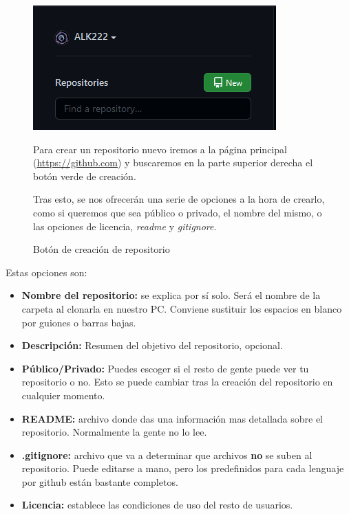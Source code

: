 \begin{figure}[ht]
    \begin{minipage}{0.3\linewidth}
        \centering
        \includegraphics[width=0.9\linewidth,]{creacion_repo.png}
        \caption{Botón de creación de repositorio}
        \label{fig:crea_repo}
    \end{minipage}%
    \begin{minipage}[b]{0.7\linewidth}
        \setlength{\parindent}{0.2in}

        Para crear un repositorio nuevo iremos a la página principal (\url{https://github.com}) y buscaremos en la parte superior derecha el botón verde de creación.

        Tras esto, se nos ofrecerán una serie de opciones a la hora de crearlo, como si queremos que sea público o privado, el nombre del mismo, o las opciones de licencia, \textit{readme} y \textit{gitignore}.
    \end{minipage}
\end{figure}

Estas opciones son:
\begin{itemize}
    \item\textbf{Nombre del repositorio:} se explica por sí solo. Será el nombre de la carpeta al clonarla en nuestro PC. Conviene sustituir los espacios en blanco por guiones o barras bajas.
    \item\textbf{Descripción:} Resumen del objetivo del repositorio, opcional.
    \item\textbf{Público/Privado:} Puedes escoger si el resto de gente puede ver tu repositorio o no. Esto se puede cambiar tras la creación del repositorio en cualquier momento.
    \item\textbf{README:} archivo donde das una información mas detallada sobre el repositorio. Normalmente la gente no lo lee.
    \item\textbf{.gitignore:} archivo que va a determinar que archivos \textbf{no} se suben al repositorio. Puede editarse a mano, pero los predefinidos para cada lenguaje por github están bastante completos.
    \item\textbf{Licencia:} establece las condiciones de uso del resto de usuarios.
\end{itemize}

